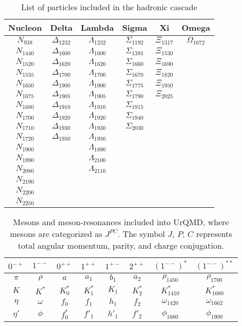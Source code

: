 \begin{table}[!hbt]
\centering
\caption{List of particles included in the hadronic cascade}
\label{Baryons}
	\begin{tabular}{cccccc}
		\hline
		Nucleon & Delta & Lambda & Sigma & Xi & Omega\\
		\hline
		\hline
		$N_{938 }$ & $\Delta_{1232}$ & $\Lambda_{1232}$ & $\Sigma_{1192}$ & $\Xi_{1317}$ & $\Omega_{1672}$\\
		$N_{1440}$ & $\Delta_{1600}$ & $\Lambda_{1600}$ & $\Sigma_{1385}$ & $\Xi_{1530}$ & \\
		$N_{1520}$ & $\Delta_{1620}$ & $\Lambda_{1620}$ & $\Sigma_{1660}$ & $\Xi_{1690}$ & \\
		$N_{1535}$ & $\Delta_{1700}$ & $\Lambda_{1700}$ & $\Sigma_{1670}$ & $\Xi_{1820}$ & \\
		$N_{1650}$ & $\Delta_{1900}$ & $\Lambda_{1900}$ & $\Sigma_{1775}$ & $\Xi_{1950}$ & \\
		$N_{1675}$ & $\Delta_{1905}$ & $\Lambda_{1905}$ & $\Sigma_{1790}$ & $\Xi_{2025}$ & \\
		$N_{1680}$ & $\Delta_{1910}$ & $\Lambda_{1910}$ & $\Sigma_{1915}$ &  & \\
		$N_{1700}$ & $\Delta_{1920}$ & $\Lambda_{1920}$ & $\Sigma_{1940}$ &  & \\
		$N_{1710}$ & $\Delta_{1930}$ & $\Lambda_{1930}$ & $\Sigma_{2030}$ &  & \\
		$N_{1720}$ & $\Delta_{1950}$ & $\Lambda_{1950}$ &  &  & \\
		$N_{1900}$ &  & $\Lambda_{1890}$ &  &  & \\
		$N_{1990}$ &  & $\Lambda_{2100}$ &  &  & \\
		$N_{2080}$ &  & $\Lambda_{2110}$ &  &  & \\
		$N_{2190}$ &  &  &  &  & \\
		$N_{2200}$ &  &  &  &  & \\
		$N_{2250}$ &  &  &  &  & \\
		\hline
		\hline
	\end{tabular}
\end{table}
\begin{table}[!hbt]
	\centering
	\caption{Mesons and meson-resonances included into UrQMD, where mesons are categorized as $J^{PC}$. The symbol $J$, $P$, $C$ represents total angular momentum, parity, and charge conjugation. }
	\label{mesons}
	\begin{tabular}{cccccccc}
		\hline
		$0^{-+}$& $1^{--}$& $0^{++}$& $1^{++}$& $1^{+-} $&$2^{++}$ &$(1^{--})^*$ &$(1^{--})^{**}$\\
		\hline
		\hline
		$\pi$& $\rho$& $a$& $a_1$& $b_1$&$a_2$ &$\rho_{1450}$ &$\rho_{1700}$\\
		$K$ &$K^*$ &$K_0^*$&$K_1^*$ &$K_1$ &$K_2^*$ &$K^*_{1410}$ &$K^*_{1680}$\\
		$\eta$& $\omega$& $f_0$& $f_1$& $h_1$&$f_2$ &$\omega_{1420}$ &$\omega_{1662}$\\
		$\eta'$& $\phi$& $f^*_0$& $f'_1$& $h'_1$&$f'_2$ &$\phi_{1680}$ &$\phi_{1900}$\\

		\hline
		\hline
	\end{tabular}
\end{table}

